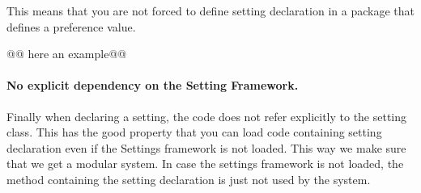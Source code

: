 \documentclass[a4paper,10pt,twoside]{book}
\begin{document}
This means that you are not forced to define setting declaration in a package that defines a preference value.

@@ here an example@@


\paragraph{No explicit dependency on the Setting Framework.}
Finally when declaring a setting, the code does not refer explicitly to the setting class. This has the good property 
that you can load code containing setting declaration even if the Settings framework is not loaded. This way we make sure 
that we get a modular system. In case the settings framework is not loaded, the method containing the setting declaration 
is just not used by the system.
\end{document}
